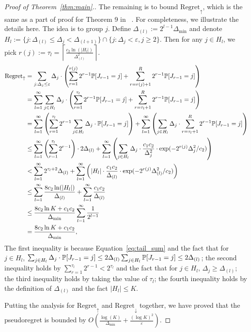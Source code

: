 \begin{proof}[Proof of Theorem~\ref{thm:main}.]
The remaining is to bound $\text{Regret}_{\uparrow}$, which is the same as a part of proof for Theorem 9 in ~\citet{hu2021near}.
For completeness, we illustrate the details here.
The idea is to group $j$. Define $\Delta_{(l)}:= 2^{l-1}\Delta_{\min}$ and denote $H_l := \{j: \Delta_{(l)} \leq \Delta_j < \Delta_{(l+1)}\}\cap \{j: \Delta_j < \varepsilon, j\geq 2\}$.
Then for any $j\in H_l$, we pick $r(j) := \tau_l = \left\lceil \frac{c_2\ln(|H_l|)}{\Delta_{(l)}^2} \right\rceil$.
\begin{align*}
	\text{Regret}_{\uparrow} &= \sum_{j:\Delta_j\leq \varepsilon}\Delta_{j}\cdot \left(\sum_{r=1}^{r(j)} 2^{r-1}\mathbb{P}[J_{r-1} = j] +\sum_{r=r(j)+1}^{R} 2^{r-1}\mathbb{P}[J_{r-1} = j]\right) \\
	& = \sum_{l=1}^{\infty}\sum_{j\in H_l} \Delta_{j}\cdot \left(\sum_{r=1}^{\tau_l} 2^{r-1}\mathbb{P}[J_{r-1} = j] +\sum_{r=\tau_l+1}^{R} 2^{r-1}\mathbb{P}[J_{r-1} = j]\right) \\
	& = \sum_{l=1}^{\infty} \left(\sum_{r=1}^{\tau_l}2^{r-1} \sum_{j\in H_l}\Delta_j\cdot \mathbb{P}[J_{r-1} = j] \right) + \sum_{l=1}^{\infty} \left(\sum_{j\in H_l}\Delta_j\cdot  \sum_{r=\tau_l+1}^{R}2^{r-1} \mathbb{P}[J_{r-1} = j] \right)\\
	& \leq \sum_{l=1}^{\infty} \left(\sum_{r=1}^{\tau_l}2^{r-1}\right)\cdot 2\Delta_{(l)}+ \sum_{l=1}^{\infty} \left(\sum_{j\in H_l}\Delta_j\cdot \frac{c_1c_2}{\Delta_j ^2}\cdot \exp(-2^{r(j)}\Delta_j^2 / c_2) \right)\\
	& < \sum_{l=1}^{\infty} 2^{\tau_l+2}\Delta_{(l)}+ \sum_{l=1}^{\infty} \left(|H_l|\cdot\frac{c_1c_2}{\Delta_{(l)}}\cdot \exp(-2^{r(j)}\Delta_{(l)}^2 / c_2) \right)\\
	& \leq \sum_{l=1}^{\infty}\frac{8c_2\ln(|H_l|)}{\Delta_{(l)}} + \sum_{l=1}^{\infty} \frac{c_1c_2}{\Delta_{(l)}} \\
	& \leq \frac{8c_2\ln K + c_1c_2}{\Delta_{\min}}\sum_{l=1}^{\infty}\frac{1}{2^{l-1}}\\
	& = \frac{8c_2\ln K + c_1c_2}{\Delta_{\min}},
	\end{align*}
The first inequality is because Equation~\ref{eq:tail_sum} and the fact that for $j\in H_l$, $\sum_{j\in H_l}\Delta_j\cdot \mathbb{P}[J_{r-1} = j]\leq 2\Delta_{(l)}\sum_{j\in H_l}\mathbb{P}[J_{r-1} = j]\leq 2\Delta_{(l)}$; the second inequality holds by $\sum_{r=1}^{\tau_l}2^{r-1} < 2^{\tau_l}$ and the fact that for $j\in H_l$, $\Delta_j\geq \Delta_{(l)}$; the third inequality holds by taking the value of $\tau_l$; the fourth inequality holds by the definition of $\Delta_{(l)}$ and the fact $|H_l|\leq K$.

Putting the analysis for $\text{Regret}_{\uparrow}$ and $\text{Regret}_{\downarrow}$ together, we have proved that the pseudoregret is bounded by $O\left(\frac{\log(K)}{\Delta_{\min}} + \frac{(\log K)^2}{\varepsilon}\right)$.
\end{proof}


